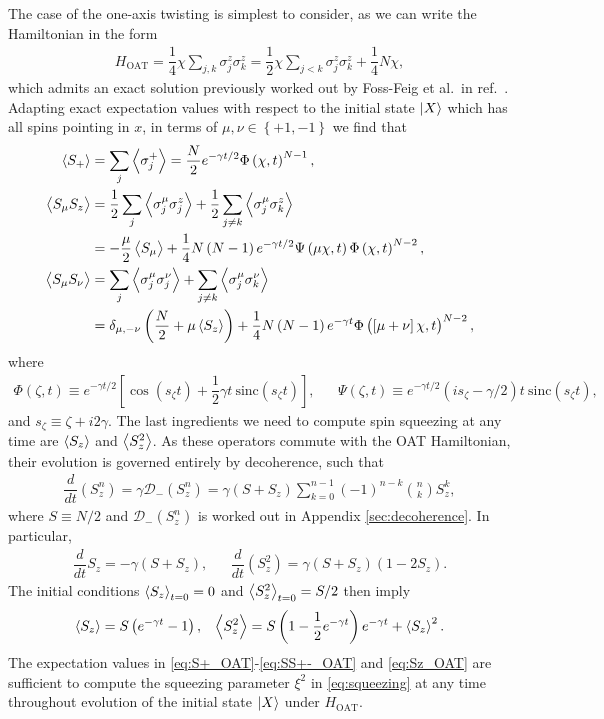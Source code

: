 \documentclass[aps,notitlepage,nofootinbib,11pt]{revtex4-1}
\renewcommand{\t}{\text} %
\newcommand{\f}[2]{\dfrac{#1}{#2}} %
\newcommand{\p}[1]{\left(#1\right)} %
\renewcommand{\sp}[1]{\left[#1\right]} %
\renewcommand{\set}[1]{\left\{#1\right\}} %
\newcommand{\bk}{\Braket} %
\newcommand{\D}{\mathcal{D}}
\newcommand{\1}{\mathds{1}}
\begin{document}
The case of the one-axis twisting is simplest to consider, as we can
write the Hamiltonian in the form
\begin{align}
  H_{\t{OAT}} = \f14 \chi \sum_{j,k} \sigma_j^z \sigma_k^z
  = \f12 \chi \sum_{j<k} \sigma_j^z \sigma_k^z + \f14 N \chi,
\end{align}
which admits an exact solution previously worked out by Foss-Feig et
al.~in ref.~\cite{foss-feig2013nonequilibrium}.  Adapting exact
expectation values with respect to the initial state $\ket{X}$ which
has all spins pointing in $x$, in terms of $\mu,\nu\in\set{+1,-1}$ we
find that
\begin{align}
  \bk{S_+}
  &= \sum_j\bk{\sigma_j^+}
  = \f{N}{2} e^{-\gamma t/2} \Phi\p{\chi,t}^{N-1}, \label{eq:S+_OAT} \\
  \bk{S_\mu S_z}
  &= \f12\sum_j\bk{\sigma_j^\mu\sigma_j^z}
  + \f12\sum_{j\ne k} \bk{\sigma_j^\mu \sigma_k^z} \\
  &= -\f{\mu}{2}\bk{S_\mu} + \f14 N \p{N-1} e^{-\gamma t/2}
  \Psi\p{\mu\chi,t} \Phi\p{\chi,t}^{N-2}, \\
  \bk{S_\mu S_\nu}
  &= \sum_j \bk{\sigma_j^\mu \sigma_j^\nu}
  + \sum_{j\ne k} \bk{\sigma_j^\mu \sigma_k^\nu} \\
  &= \delta_{\mu,-\nu} \p{\f{N}{2} + \mu \bk{S_z}}
  + \f14 N \p{N-1} e^{-\gamma t}
  \Phi\p{\sp{\mu+\nu}\chi,t}^{N-2}, \label{eq:SS+-_OAT}
\end{align}
where
\begin{align}
  \Phi\p{\zeta,t} \equiv e^{-\gamma t/2}
  \sp{\cos\p{s_\zeta t}+\f12\gamma t~\t{sinc}\p{s_\zeta t}},
  &&
  \Psi\p{\zeta,t} \equiv e^{-\gamma t/2}
  \p{is_\zeta-\gamma/2}t~ \t{sinc}\p{s_\zeta t},
\end{align}
and $s_\zeta \equiv \zeta + i2\gamma$.  The last ingredients we need
to compute spin squeezing at any time are $\bk{S_z}$ and $\bk{S_z^2}$.
As these operators commute with the OAT Hamiltonian, their evolution
is governed entirely by decoherence, such that
\begin{align}
  \f{d}{dt}\p{S_z^n}
  = \gamma \D_-\p{S_z^n}
  = \gamma \p{S + S_z} \sum_{k=0}^{n-1}
  \p{-1}^{n-k} { n \choose k } S_z^k,
\end{align}
where $S\equiv N/2$ and $\D_-\p{S_z^n}$ is worked out in Appendix
\ref{sec:decoherence}.  In particular,
\begin{align}
  \f{d}{dt} S_z = -\gamma \p{S + S_z},
  &&
  \f{d}{dt}\p{S_z^2} = \gamma \p{S + S_z} \p{1 - 2S_z}.
\end{align}
The initial conditions $\bk{S_z}_{t=0}=0$ and $\bk{S_z^2}_{t=0}=S/2$
then imply
\begin{align}
  \bk{S_z} = S\p{e^{-\gamma t}-1},
  &&
  \bk{S_z^2} = S \p{1 - \f12 e^{-\gamma t}} e^{-\gamma t} + \bk{S_z}^2.
  \label{eq:Sz_OAT}
\end{align}
The expectation values in \eqref{eq:S+_OAT}-\eqref{eq:SS+-_OAT} and
\eqref{eq:Sz_OAT} are sufficient to compute the squeezing parameter
$\xi^2$ in \eqref{eq:squeezing} at any time throughout evolution of
the initial state $\ket{X}$ under $H_{\t{OAT}}$.
\end{document}
